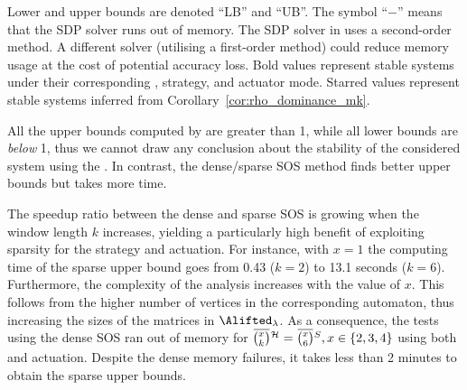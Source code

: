 Lower and upper bounds are denoted ``LB'' and ``UB''. 
The symbol ``$-$'' means that the SDP solver runs out of memory.
The SDP solver in  uses a second-order method.
A different solver (utilising a first-order method) could reduce memory usage at the cost of potential accuracy loss.
Bold values represent stable systems under their corresponding \ewhc{}, strategy, and actuator mode.
Starred values represent stable systems inferred from Corollary~\ref{cor:rho_dominance_mk}.

All the upper bounds computed by  are greater than 1, while all lower bounds are \emph{below} 1, thus we cannot draw any conclusion about the stability of the considered system using the .
In contrast, the dense/sparse SOS method finds better upper bounds but takes more time.

The speedup ratio between the dense and sparse SOS is growing when the window length $k$ increases, yielding a particularly high benefit of exploiting sparsity for the \tS{} strategy and \tZ{} actuation.
For instance, with $x=1$ the computing time of the sparse upper bound goes from 0.43 ($k=2$) to 13.1 seconds ($k=6$).
%
Furthermore, the complexity of the analysis increases with the value of $x$.
This follows from the higher number of vertices in the corresponding automaton, thus increasing the sizes of the matrices in $\Alifted_{\lambda}$. 
%
As a consequence, the tests using the dense SOS ran out of memory for $\eanymiss{}{\strat} = \overbar{\binom{x}{6}}^{S}, x \in \left\{ 2, 3, 4 \right\}$ using both \tH{} and \tZ{} actuation.
Despite the dense memory failures, it takes less than 2 minutes to obtain the sparse upper bounds.


